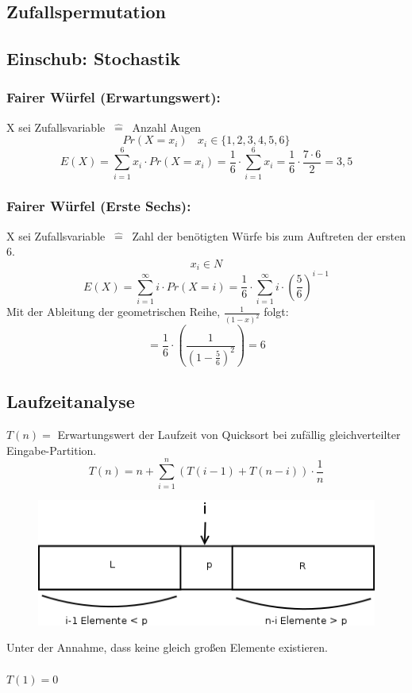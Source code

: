 \subsection{Zufallspermutation}

\clearpage
\begin{mdframed}
\subsection{Einschub: Stochastik}
\subsubsection{Fairer Würfel (Erwartungswert):} X sei Zufallsvariable $~\hat{=}~$ Anzahl Augen\\
\[Pr(X=x_i)~~~~x_i \in \{1,2,3,4,5,6\} \]
\[E(X) = \sum_{i=1}^6 x_i \cdot Pr(X=x_i) = \frac{1}{6} \cdot \sum_{i=1}^6 x_i = \frac{1}{6} \cdot \frac{7 \cdot 6}{2} = 3,5 \]

\subsubsection{Fairer Würfel (Erste Sechs):} X sei Zufallsvariable  $~\hat{=}~$ Zahl der benötigten Würfe bis zum Auftreten der ersten 6.
\[x_i \in N\]
\[E(X) = \sum_{i=1}^{\infty} i \cdot Pr(X=i) = \frac{1}{6} \cdot \sum_{i=1}^{\infty} i \cdot \left(\frac{5}{6} \right)^{i-1} \]
Mit der Ableitung der geometrischen Reihe, $\frac{1}{(1-x)^2}$ folgt:\\
\[= \frac{1}{6} \cdot \left(\frac{1}{ \left(1-\frac{5}{6} \right)^2} \right) = 6 \]
\end{mdframed}


\subsection{Laufzeitanalyse}
$T(n) =$ Erwartungswert der Laufzeit von Quicksort bei zufällig gleichverteilter Eingabe-Partition.
\[T(n) = n + \sum_{i=1}^n (T(i-1) + T(n-i)) \cdot \frac{1}{n} \]
\vspace{20pt}
\begin{figure}
\vspace{-60pt}
\includegraphics[width=\linewidth]{06/Grafik/img3.png}
\caption{}
\vspace{300pt}
\end{figure}
Unter der Annahme, dass keine gleich großen Elemente existieren.\\
\\
$T(1) = 0 $
\pagebreak
